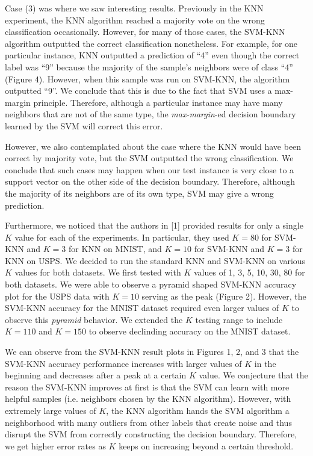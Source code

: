 \documentclass[11pt,letterpaper]{article}
\begin{document}
Case (3) was where we saw interesting results. Previously in the KNN experiment, the KNN algorithm reached a majority vote on the wrong classification occasionally. However, for many of those cases, the SVM-KNN algorithm outputted the correct classification nonetheless. For example, for one particular instance, KNN outputted a prediction of ``4'' even though the correct label was ``9'' because the majority of the sample's neighbors were of class ``4'' (Figure 4). However, when this sample was run on SVM-KNN, the algorithm outputted ``9''. We conclude that this is due to the fact that SVM uses a max-margin principle. Therefore, although a particular instance may have many neighbors that are not of the same type, the \textit{max-margin}-ed decision boundary learned by the SVM will correct this error.

However, we also contemplated about the case where the KNN would have been correct by majority vote, but the SVM outputted the wrong classification. We conclude that such cases may happen when our test instance is very close to a support vector on the other side of the decision boundary. Therefore, although the majority of its neighbors are of its own type, SVM may give a wrong prediction.

Furthermore, we noticed that the authors in [1] provided results for only a single $K$ value for each of the experiments. In particular, they used $K=80$ for SVM-KNN and $K=3$ for KNN on MNIST,  and $K=10$ for SVM-KNN and $K=3$ for KNN on USPS. We decided to run the standard KNN and SVM-KNN on various $K$ values for both datasets. We first tested with $K$ values of 1, 3, 5, 10, 30, 80 for both datasets. We were able to observe a pyramid shaped SVM-KNN accuracy plot for the USPS data with $K=10$ serving as the peak (Figure 2). However, the SVM-KNN accuracy for the MNIST dataset required even larger values of $K$ to observe this \textit{pyramid} behavior. We extended the $K$ testing range to include $K=110$ and $K=150$ to observe declinding accuracy on the MNIST dataset.

We can observe from the SVM-KNN result plots in Figures 1, 2, and 3 that the SVM-KNN accuracy performance increases with larger values of $K$ in the beginning and decreases after a peak at a certain $K$ value. We conjecture that the reason the SVM-KNN improves at first is that the SVM can learn with more helpful samples (i.e. neighbors chosen by the KNN algorithm). However, with extremely large values of $K$, the KNN algorithm hands the SVM algorithm a neighborhood with many outliers from other labels that create noise and thus disrupt the SVM from correctly constructing the decision boundary. Therefore, we get higher error rates as $K$ keeps on increasing beyond a certain threshold.
 
\end{document}
